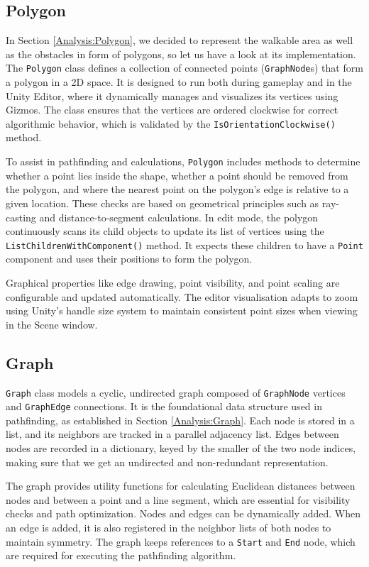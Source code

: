  
\subsection{Polygon}
In Section \ref{Analysis:Polygon}, we decided to represent the walkable area as well as the obstacles in form of polygons, so let us have a look at its implementation. The \verb|Polygon| class defines a collection of connected points (\verb|GraphNode|s) that form a polygon in a 2D space. It is designed to run both during gameplay and in the Unity Editor, where it dynamically manages and visualizes its vertices using Gizmos. The class ensures that the vertices are ordered clockwise for correct algorithmic behavior, which is validated by the \verb|IsOrientationClockwise()| method.

To assist in pathfinding and calculations, \verb|Polygon| includes methods to determine whether a point lies inside the shape, whether a point should be removed from the polygon, and where the nearest point on the polygon's edge is relative to a given location. These checks are based on geometrical principles such as ray-casting and distance-to-segment calculations. In edit mode, the polygon continuously scans its child objects to update its list of vertices using the \verb|ListChildrenWithComponent()| method. It expects these children to have a \verb|Point| component and uses their positions to form the polygon.

Graphical properties like edge drawing, point visibility, and point scaling are configurable and updated automatically. The editor visualisation adapts to zoom using Unity’s handle size system to maintain consistent point sizes when viewing in the Scene window.


\subsection{Graph}
\verb|Graph| class models a cyclic, undirected graph composed of \verb|GraphNode| vertices and \verb|GraphEdge| connections. It is the foundational data structure used in pathfinding, as established in Section \ref{Analysis:Graph}. Each node is stored in a list, and its neighbors are tracked in a parallel adjacency list. Edges between nodes are recorded in a dictionary, keyed by the smaller of the two node indices, making sure that we get an undirected and non-redundant representation.

The graph provides utility functions for calculating Euclidean distances between nodes and between a point and a line segment, which are essential for visibility checks and path optimization. Nodes and edges can be dynamically added. When an edge is added, it is also registered in the neighbor lists of both nodes to maintain symmetry. The graph keeps references to a \verb|Start| and \verb|End| node, which are required for executing the pathfinding algorithm.

